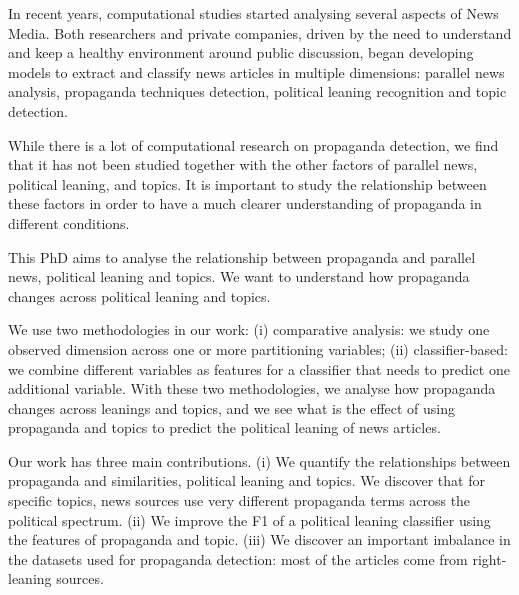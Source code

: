 In recent years, computational studies started analysing several aspects of News Media.
Both researchers and private companies, driven by the need to understand and keep a healthy environment around public discussion, began developing models to extract and classify news articles in multiple dimensions: parallel news analysis, propaganda techniques detection, political leaning recognition and topic detection.

While there is a lot of computational research on propaganda detection, we find that it has not been studied together with the other factors of 
parallel news, political leaning, and topics.
It is important to study the relationship between these factors in order to have a much clearer understanding of propaganda in different conditions.


This PhD aims to analyse the relationship between propaganda and parallel news, political leaning and topics. We want to understand how propaganda changes across political leaning and topics.


We use two methodologies in our work:
(i) comparative analysis: we study one observed dimension across one or more partitioning variables;
(ii) classifier-based: we combine different variables as features for a classifier that needs to predict one additional variable.
With these two methodologies, we analyse how propaganda changes across leanings and topics, and we see what is the effect of using propaganda and topics to predict the political leaning of news articles. 


Our work has three main contributions.
(i) We quantify the relationships between propaganda and similarities, political leaning and topics. We discover that for specific topics, news sources use very different propaganda terms across the political spectrum.
(ii) We improve the F1 of a political leaning classifier using the features of propaganda and topic.
(iii) We discover an important imbalance in the datasets used for propaganda detection: most of the articles come from right-leaning sources.


